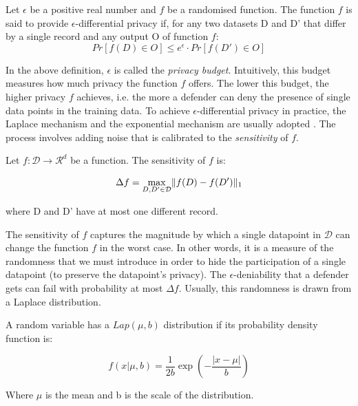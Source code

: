 \begin{definition}
	Let $\epsilon$ be a positive real number and $f$ be a randomised function. The function $f$ is said to provide $\epsilon$-differential privacy if, for any two datasets D and D' that differ by a single record and any output O of function $f$:
	\begin{equation}
		Pr[f(D) \in O] \leq e^{\epsilon} \cdot Pr[f(D') \in O]
	\end{equation}	
\end{definition}

In the above definition, $\epsilon$ is called the \textit{privacy budget}. Intuitively, this budget measures how much privacy the function $f$ offers. The lower this budget, the higher privacy $f$ achieves, i.e. the more a defender can deny the presence of single data points in the training data. To achieve $\epsilon$-differential privacy in practice, the Laplace mechanism and the exponential mechanism are usually adopted \cite{dwork_roth}. The process involves adding noise that is calibrated to the \textit{sensitivity} of $f$.

\begin{definition}\label{def:sensitivity}
	Let $f: \mathcal{D} \rightarrow \mathcal{R}^d$ be a function. The sensitivity of $f$ is:
	
	\begin{equation}
		\Delta f = \max_{D,D' \in \mathcal{D}} \lVert f(D)-f(D')\rVert_1
	\end{equation}

	where D and D' have at most one different record.
	 
\end{definition}

The sensitivity of $f$ captures the magnitude by which a single datapoint in $\mathcal{D}$ can change the function $f$ in the worst case. In other words, it is a measure of the randomness that we must introduce in order to hide the participation of a single datapoint (to preserve the datapoint's privacy). The $\epsilon$-deniability that a defender gets can fail with probability at most $\Delta f$. Usually, this randomness is drawn from a Laplace distribution.

\begin{definition}\label{def:laplace_distribution}
	A random variable has a $Lap(\mu, b)$ distribution if its probability density function is:
	
	\begin{equation}
		f(x | \mu, b) = \frac{1}{2b}\exp\left(- \frac{|x-\mu|}{b}\right)
	\end{equation}

	Where $\mu$ is the mean and b is the scale of the distribution.
	
\end{definition}

